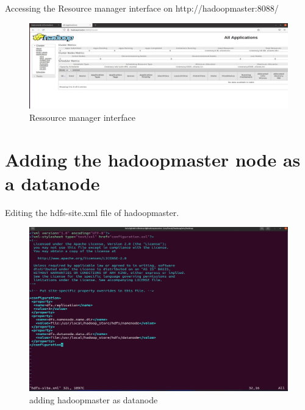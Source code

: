 \begin{spacing}{1.2}
\par Accessing the Resource manager interface on http://hadoopmaster:8088/
\\
\begin{figure}[!htb] 
\begin{center} 
\includegraphics[width=1\linewidth]{Big_Data/Hadoop/Multi-Nodes Cluster/Ressource manager interface} 
\end{center} 
\caption{Ressource manager interface} 
\end{figure} 
\FloatBarrier

\section{Adding the hadoopmaster node as a datanode }

\par Editing the hdfs-site.xml file of hadoopmaster.
\\
\begin{figure}[!htb] 
\begin{center} 
\includegraphics[width=1\linewidth]{Big_Data/Hadoop/Multi-Nodes Cluster/adding hadoopmaster as datanode} 
\end{center} 
\caption{adding hadoopmaster as datanode} 
\end{figure} 
\FloatBarrier



\end{spacing}

